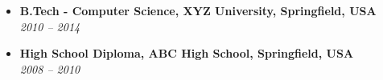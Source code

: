 \documentclass[a4paper,10pt]{article}
\begin{document}
    \vspace{2em}
    \begin{itemize}
        \item \textbf{B.Tech - Computer Science, XYZ University, Springfield, USA}\\
        \emph{2010 -- 2014}
        \item \textbf{High School Diploma, ABC High School, Springfield, USA}\\
        \emph{2008 -- 2010}
    \end{itemize}
\end{document}

